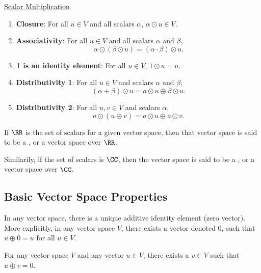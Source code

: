 \begin{definition}
  \underline{Scalar Multiplication}
  \begin{enumerate}[(S1)]
    \item \textbf{Closure}: For all $u \in V$ and all scalars $\alpha$, $\alpha \odot u \in V$.
    \item \textbf{Associativity}: For all $u \in V$ and all scalars $\alpha$ and $\beta$,
      \begin{equation*}
        \alpha \odot (\beta \odot u) = (\alpha \cdot \beta) \odot u.
      \end{equation*}
    \item \textbf{1 is an identity element}: For all $u \in V$, $1 \odot u = u$.
    \item \textbf{Distributivity 1}: For all $u \in V$ and scalars $\alpha$ and $\beta$,
      \begin{equation*}
        (\alpha + \beta) \odot u = a \odot u \oplus \beta \odot u.
      \end{equation*}
    \item \textbf{Distributivity 2}: For all $u, v \in V$ and scalars $\alpha$,
      \begin{equation*}
        a \odot (u \oplus v) = a \odot u \oplus a \odot v.
      \end{equation*}
  \end{enumerate}
\end{definition}

\begin{definition}
  If $\RR$ is the set of scalars for a given vector space, then that vector space is said to be a 
  , or a vector space over $\RR$. 

  Similarily, if the set of scalars is $\CC$, then the vector space is said to be a 
  , or a vector space over $\CC$.
\end{definition}

\subsection{Basic Vector Space Properties}
\begin{theorem}
  In any vector space, there is a unique additive identity element (zero vector).
  More explicitly, in any vector space $V$, there exists a  vector denoted 0,
  such that $u \oplus 0 = u$ for all $u \in V$.
\end{theorem}

\begin{theorem}
  For any vector space $V$ and any vector $u \in V$, there exists a  $v \in V$ such that 
  $u \oplus v = 0$.
\end{theorem}

